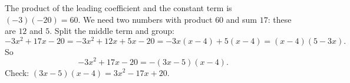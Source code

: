 The product of the leading coefficient and the constant term is $(-3)(-20)=60$. We need two numbers with product $60$ and sum $17$: these are $12$ and $5$. Split the middle term and group:
\[-3x^2+17x-20=-3x^2+12x+5x-20=-3x(x-4)+5(x-4)=(x-4)(5-3x).\]
So
\[-3x^2+17x-20=\boxed{-(3x-5)(x-4)}.\]
Check: $(3x-5)(x-4)=3x^2-17x+20$.
